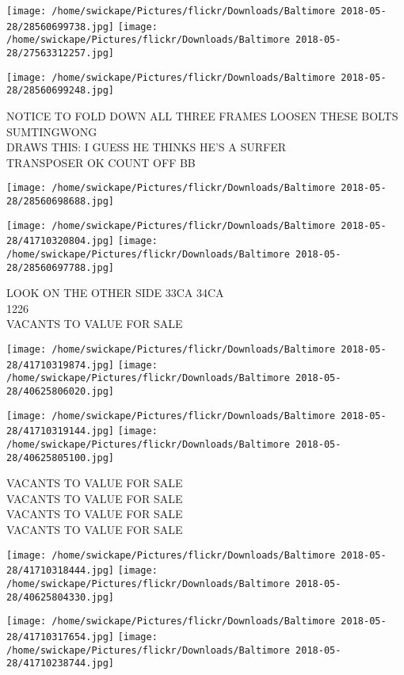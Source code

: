 \documentclass[10pt,letterpaper]{article}
\begin{document}
\texttt{[image: /home/swickape/Pictures/flickr/Downloads/Baltimore 2018-05-28/28560699738.jpg]}
\texttt{[image: /home/swickape/Pictures/flickr/Downloads/Baltimore 2018-05-28/27563312257.jpg]}

\texttt{[image: /home/swickape/Pictures/flickr/Downloads/Baltimore 2018-05-28/28560699248.jpg]}

NOTICE TO FOLD DOWN ALL THREE FRAMES LOOSEN THESE BOLTS SUMTINGWONG\\
DRAWS THIS: I GUESS HE THINKS HE'S A SURFER\\
TRANSPOSER OK COUNT OFF BB\\
\pagebreak

\texttt{[image: /home/swickape/Pictures/flickr/Downloads/Baltimore 2018-05-28/28560698688.jpg]}

\vspace{0.25in}
\texttt{[image: /home/swickape/Pictures/flickr/Downloads/Baltimore 2018-05-28/41710320804.jpg]}
\texttt{[image: /home/swickape/Pictures/flickr/Downloads/Baltimore 2018-05-28/28560697788.jpg]}

LOOK ON THE OTHER SIDE 33CA 34CA\\
1226\\
VACANTS TO VALUE FOR SALE\\
\pagebreak

\texttt{[image: /home/swickape/Pictures/flickr/Downloads/Baltimore 2018-05-28/41710319874.jpg]}
\texttt{[image: /home/swickape/Pictures/flickr/Downloads/Baltimore 2018-05-28/40625806020.jpg]}

\texttt{[image: /home/swickape/Pictures/flickr/Downloads/Baltimore 2018-05-28/41710319144.jpg]}
\texttt{[image: /home/swickape/Pictures/flickr/Downloads/Baltimore 2018-05-28/40625805100.jpg]}

VACANTS TO VALUE FOR SALE\\
VACANTS TO VALUE FOR SALE\\
VACANTS TO VALUE FOR SALE\\
VACANTS TO VALUE FOR SALE\\
\pagebreak

\texttt{[image: /home/swickape/Pictures/flickr/Downloads/Baltimore 2018-05-28/41710318444.jpg]}
\texttt{[image: /home/swickape/Pictures/flickr/Downloads/Baltimore 2018-05-28/40625804330.jpg]}

\texttt{[image: /home/swickape/Pictures/flickr/Downloads/Baltimore 2018-05-28/41710317654.jpg]}
\texttt{[image: /home/swickape/Pictures/flickr/Downloads/Baltimore 2018-05-28/41710238744.jpg]}
\end{document}
